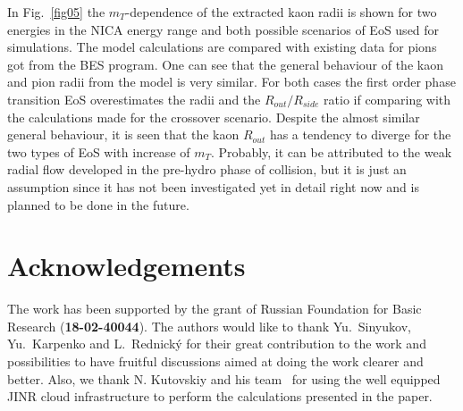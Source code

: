 \documentclass[a4paper]{panl}
\begin{document}
In Fig.~\ref{fig05} the $m_{T}$-dependence of the extracted kaon radii is shown for two energies in the NICA energy range and both possible scenarios of EoS used for simulations.
The model calculations are compared with existing data for pions got from the BES program.
One can see that the general behaviour of the kaon and pion radii from the model is very similar. For both cases the first order phase transition EoS overestimates the radii
and the $R_{out} / R_{side}$ ratio if comparing with the calculations made for the crossover scenario. Despite the almost similar general behaviour, it is seen that
the kaon $R_{out}$ has a tendency to diverge for the two types of EoS with increase of $m_{T}$. Probably, it can be attributed to the weak radial flow developed in the pre-hydro phase of
collision, but it is just an assumption since it has not been investigated yet in detail right now and is planned to be done in the future. 
  
\label{sec:Acknowledgements}
\section*{Acknowledgements}
The work has been supported by the grant of Russian Foundation for Basic Research ({\bf 18-02-40044}).
The authors would like to thank Yu.~Sinyukov, Yu.~Karpenko and L.~Rednick\'{y} for their great contribution to the work and possibilities to have fruitful discussions
aimed at doing the work clearer and better.
Also, we thank N. Kutovskiy and his team~\cite{jinrCloud} for using the well equipped JINR cloud infrastructure to perform the calculations presented in the paper.
\end{document}
